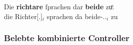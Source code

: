 {\begin{tabular}[t]{
				@{}
				>{\itshape}l @{~}
				>{\itshape}l @{~}
				>{\itshape}l @{~}
				>{\itshape}l @{~}
				>{\itshape}l @{~}
				>{\itshape}l @{~}
				>{\itshape}l
				l
				@{}
			}


			\end{tabular}
		}

\begin{exe}
\ex \label{ex:gendassgmt2}
	\gll Die \textbf{richtare} ſprachen dar \textbf{beide} zuͦ. \\
		die Richter[\Nom.\Pl\subM]$_i$ sprachen da
			beide-\Nom.\Pl\subM.\St{}$_i$ zu \\
	\begin{taggedline}{\parencites[60\vb,
	28]{kc:H}[vgl.~abweichend][10090]{schroeder1895}}
	\trans {}
	\end{taggedline}
\end{exe}

\subsubsection{Belebte kombinierte Controller}
\label{subsubsec:x+x_dir_anim}

